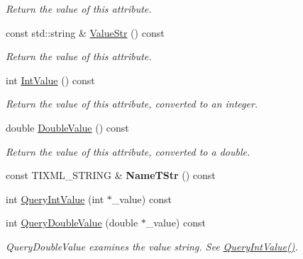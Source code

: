 \begin{DoxyCompactItemize}
\begin{DoxyCompactList}\small\item\em Return the value of this attribute. \end{DoxyCompactList}\item 
\hypertarget{class_ti_xml_attribute_af70a11c3a0c07e61bd6e215f1f9b24e9}{}\label{class_ti_xml_attribute_af70a11c3a0c07e61bd6e215f1f9b24e9} 
const std\+::string \& \hyperlink{class_ti_xml_attribute_af70a11c3a0c07e61bd6e215f1f9b24e9}{Value\+Str} () const
\begin{DoxyCompactList}\small\item\em Return the value of this attribute. \end{DoxyCompactList}\item 
\hypertarget{class_ti_xml_attribute_ac8501370b065df31a35003c81d87cef2}{}\label{class_ti_xml_attribute_ac8501370b065df31a35003c81d87cef2} 
int \hyperlink{class_ti_xml_attribute_ac8501370b065df31a35003c81d87cef2}{Int\+Value} () const
\begin{DoxyCompactList}\small\item\em Return the value of this attribute, converted to an integer. \end{DoxyCompactList}\item 
\hypertarget{class_ti_xml_attribute_a8cca240fb2a7130c87b0fc6156e8b34f}{}\label{class_ti_xml_attribute_a8cca240fb2a7130c87b0fc6156e8b34f} 
double \hyperlink{class_ti_xml_attribute_a8cca240fb2a7130c87b0fc6156e8b34f}{Double\+Value} () const
\begin{DoxyCompactList}\small\item\em Return the value of this attribute, converted to a double. \end{DoxyCompactList}\item 
\hypertarget{class_ti_xml_attribute_a2bd49ec37463a0a2d081e6587f8b89b8}{}\label{class_ti_xml_attribute_a2bd49ec37463a0a2d081e6587f8b89b8} 
const T\+I\+X\+M\+L\+\_\+\+S\+T\+R\+I\+NG \& {\bfseries Name\+T\+Str} () const
\item 
int \hyperlink{class_ti_xml_attribute_a6caa8090d2fbb7966700a16e45ed33de}{Query\+Int\+Value} (int $\ast$\+\_\+value) const
\item 
\hypertarget{class_ti_xml_attribute_a6fa41b710c1b79de37a97004aa600c06}{}\label{class_ti_xml_attribute_a6fa41b710c1b79de37a97004aa600c06} 
int \hyperlink{class_ti_xml_attribute_a6fa41b710c1b79de37a97004aa600c06}{Query\+Double\+Value} (double $\ast$\+\_\+value) const
\begin{DoxyCompactList}\small\item\em Query\+Double\+Value examines the value string. See \hyperlink{class_ti_xml_attribute_a6caa8090d2fbb7966700a16e45ed33de}{Query\+Int\+Value()}. \end{DoxyCompactList}\item 

\end{DoxyCompactItemize}
